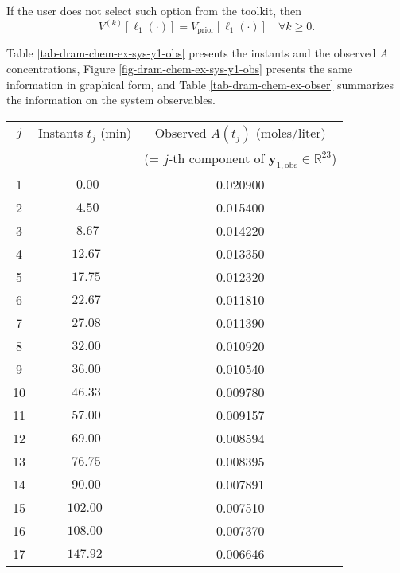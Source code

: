 If the user does not select such option from the toolkit, then
\begin{equation*}
V^{(k)}[\ell_1(\cdot)] = V_{\text{prior}}[\ell_1(\cdot)]\quad\forall k\geqslant 0.
\end{equation*}

Table \ref{tab-dram-chem-ex-sys-y1-obs} presents the instants and the observed $A$ concentrations,
Figure \ref{fig-dram-chem-ex-sys-y1-obs} presents the same information in graphical form, and
Table \ref{tab-dram-chem-ex-obser} summarizes the information on the system observables.

\begin{table}[h!]
\begin{center}
\begin{tabular}{|c|c|c|}
\hline
$j$ & Instants $t_j$ (min) & Observed $A(t_j)$ (moles/liter)                                       \\
    &                      & (= $j$-th component of $\mathbf{y}_{1,\text{obs}}\in\mathbb{R}^{23}$) \\
\hline
\hline
 1  & $~~0.00$             & 0.020900  \\
\hline
 2  & $~~4.50$             & 0.015400  \\
\hline
 3  & $~~8.67$             & 0.014220  \\
\hline
 4  & $~12.67$             & 0.013350  \\
\hline
 5  & $~17.75$             & 0.012320  \\
\hline
 6  & $~22.67$             & 0.011810  \\
\hline
 7  & $~27.08$             & 0.011390  \\
\hline
 8  & $~32.00$             & 0.010920  \\
\hline
 9  & $~36.00$             & 0.010540  \\
\hline
10  & $~46.33$             & 0.009780  \\
\hline
11  & $~57.00$             & 0.009157 \\
\hline
12  & $~69.00$             & 0.008594 \\
\hline
13  & $~76.75$             & 0.008395 \\
\hline
14  & $~90.00$             & 0.007891 \\
\hline
15  & $102.00$             & 0.007510 \\
\hline
16  & $108.00$             & 0.007370 \\
\hline
17  & $147.92$             & 0.006646 \\

\end{tabular}
\end{center}
\end{table}
